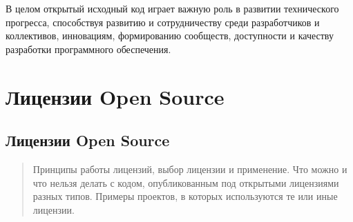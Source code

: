 \documentclass[letterpaper,10pt,russian]{sphinxmanual}
\begin{document}
\sphinxAtStartPar
В целом открытый исходный код играет важную роль в развитии технического прогресса, способствуя развитию и сотрудничеству среди разработчиков и коллективов, инновациям, формированию сообществ, доступности и качеству разработки программного обеспечения.


\chapter{Лицензии Open Source}
\label{\detokenize{index:id10}}
\sphinxstepscope


\section{Лицензии Open Source}
\label{\detokenize{educational_materials/open_license/content:open-source}}\label{\detokenize{educational_materials/open_license/content::doc}}\begin{quote}

\sphinxAtStartPar
Принципы работы лицензий, выбор лицензии и применение. Что можно и что нельзя делать с кодом, опубликованным под открытыми лицензиями разных типов. Примеры проектов, в которых используются те или иные лицензии.
\end{quote}
\end{document}

